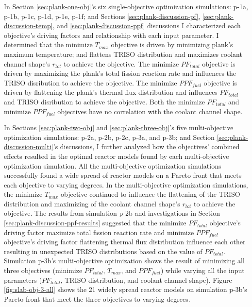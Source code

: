 In Section \ref{sec:plank-one-obj}'s six single-objective optimization simulations: 
p-1a, p-1b, p-1c, p-1d, p-1e, p-1f; and Sections \ref{sec:plank-discussion-pf}, 
\ref{sec:plank-discussion-temp}, and \ref{sec:plank-discussion-ppf} discussions    
I characterized each objective's driving factors and relationship with each input 
parameter. 
I determined that the minimize $T_{max}$ objective is driven by minimizing plank's maximum 
temperature; and flattens TRISO distribution and maximizes coolant channel shape's 
$r_{tot}$ to achieve the objective. 
The minimize $PF_{total}$ objective is driven by maximizing the plank's total fission 
reaction rate and influences the TRISO disribution to achieve the objective. 
The minimize $PPF_{fuel}$ objective is driven by flattening the plank's thermal flux
distribution and influences $PF_{total}$ and TRISO disribution to achieve the objective. 
Both the minimize $PF_{total}$ and minimize $PPF_{fuel}$ objectives have no correlation 
with the coolant channel shape. 

In Sections \ref{sec:plank-two-obj} and \ref{sec:plank-three-obj}'s five multi-objective 
optimization simulations: p-2a, p-2b, p-2c, p-3a, and p-3b; and Section 
\ref{sec:plank-discussion-multi}'s discussions, I further analyzed how the objectives' 
combined effects resulted in the optimal reactor models found by each multi-objective 
optimization simulation. 
All the multi-objective optimization simulations successfully found a wide spread of 
reactor models on a Pareto front that meets each objective to varying degrees. 
In the multi-objective optimization simulations, the minimize $T_{max}$ objective 
continued to influence the flattening of the TRISO distribution and maximizing of the 
coolant channel shape's $r_{tot}$ to achieve the objective. 
The results from simulation p-2b and investigations in Section 
\ref{sec:plank-discussion-ppf-results} suggested that the minimize $PF_{total}$ 
objective's driving factor maximize total fission reaction rate and 
minimize $PPF_{fuel}$ objective's driving factor flattening thermal flux distribution 
influence each other resulting in unexpected TRISO distributions based 
on the value of $PF_{total}$. 
Simulation p-3b's multi-objective optimization shows the result of minimizing all 
three objectives (minimize $PF_{total}$, $T_{max}$, and $PPF_{fuel}$) while varying 
all the input parameters ($PF_{total}$, TRISO distribution, and coolant channel shape).
Figure \ref{fig:slab-obj-3-all} shows the 21 widely spread reactor models on simulation 
p-3b's Pareto front that meet the three objectives to varying degrees. 

